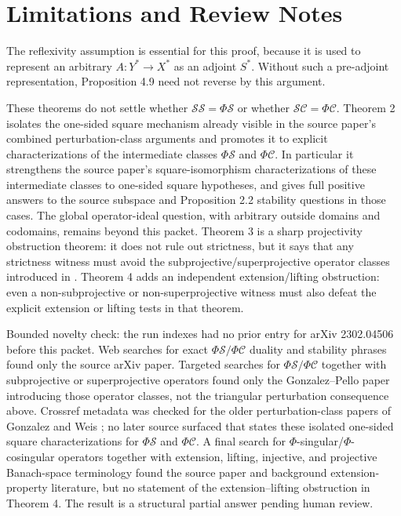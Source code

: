 \documentclass[11pt]{article}
\newcommand{\SSing}{\mathcal{SS}}
\newcommand{\SCos}{\mathcal{SC}}
\newcommand{\PhiS}{\Phi\mathcal S}
\newcommand{\PhiC}{\Phi\mathcal C}
\begin{document}
\section*{Limitations and Review Notes}

The reflexivity assumption is essential for this proof, because it is used to
represent an arbitrary \(A:Y^*\to X^*\) as an adjoint \(S^*\).  Without such a
pre-adjoint representation, Proposition 4.9 need not reverse by this argument.

These theorems do not settle whether \(\SSing=\PhiS\) or whether
\(\SCos=\PhiC\).  Theorem 2 isolates the one-sided square mechanism already
visible in the source paper's combined perturbation-class arguments and
promotes it to explicit characterizations of the intermediate classes
\(\PhiS\) and \(\PhiC\).  In particular it strengthens the source paper's
square-isomorphism characterizations of these intermediate classes to
one-sided square hypotheses, and gives full positive answers to the source
subspace and Proposition 2.2 stability questions in those cases.  The global
operator-ideal question, with arbitrary outside domains and codomains, remains
beyond this packet.  Theorem 3 is a sharp projectivity obstruction theorem: it
does not rule out strictness, but it says that any strictness witness must
avoid the subprojective/superprojective operator classes introduced in
\cite{GP24}.  Theorem 4 adds an independent extension/lifting obstruction:
even a non-subprojective or non-superprojective witness must also defeat the
explicit extension or lifting tests in that theorem.

Bounded novelty check: the run indexes had no prior entry for arXiv
2302.04506 before this packet.  Web searches for exact \(\PhiS/\PhiC\)
duality and stability phrases found only the source arXiv paper.  Targeted
searches for \(\PhiS/\PhiC\) together with subprojective or superprojective
operators found only the Gonzalez--Pello paper introducing those operator
classes, not the triangular perturbation consequence above.  Crossref
metadata was checked for the older perturbation-class papers of Gonzalez
\cite{G03} and Weis \cite{W81}; no later source surfaced that states these
isolated one-sided square characterizations for \(\PhiS\) and \(\PhiC\).
A final search for \(\Phi\)-singular/\(\Phi\)-cosingular operators together
with extension, lifting, injective, and projective Banach-space terminology
found the source paper and background extension-property literature, but no
statement of the extension--lifting obstruction in Theorem 4.  The result is a
structural partial answer pending human review.
\end{document}
